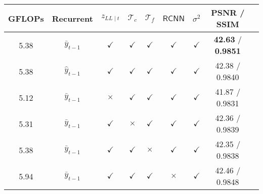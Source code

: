 \documentclass[final]{cvpr}
\newcommand{\LL}{\scriptscriptstyle{LL\mid}}
\begin{document}
    \begin{table*}[ht!]
        \centering
        \small
        \setlength{\tabcolsep}{2pt}
        \begin{subtable}{\columnwidth}
            \centering          
            \begin{tabular}{ccccccccc}
                \hline
                GFLOPs&   Recurrent    & $z_{\LL t}$  & $\mathcal{T}_c$ & $\mathcal{T}_f$  & $\mathsf{RCNN}$ &$\sigma^2$& PSNR / SSIM \\
                \hline      \hline  
                \rowcolor{LightYellow}
                5.38& $ \bar{y}_{t-1}   $ & $\checkmark$  & $\checkmark$ & $\checkmark$ & $\checkmark$  & $\checkmark$ & \textbf{42.63} / \textbf{0.9851 } \\
                5.38& $ \hat{y}_{t-1}   $ & $\checkmark$  & $\checkmark$ & $\checkmark$ & $\checkmark$  & $\checkmark$ & 42.38 / 0.9840 \\
                
                5.12& $ \bar{y}_{t-1}   $ & $\times$      & $\checkmark$ & $\checkmark$ & $\checkmark$  & $\checkmark$ & 41.87 / 0.9831 \\
                5.31& $ \bar{y}_{t-1}   $ & $\checkmark$  & $\times$     & $\checkmark$ & $\checkmark$  & $\checkmark$ & 42.36 / 0.9839 \\
                5.38& $ \bar{y}_{t-1}   $ & $\checkmark$  & $\checkmark$ & $\times$     & $\checkmark$  & $\checkmark$ & 42.35 / 0.9838 \\
                5.94& $ \bar{y}_{t-1}   $ & $\checkmark$  & $\checkmark$ & $\checkmark$ & $\times$      & $\checkmark$ & 42.46 / 0.9848 \\
                

\end{tabular}
\end{subtable}
\end{table*}
\end{document}
